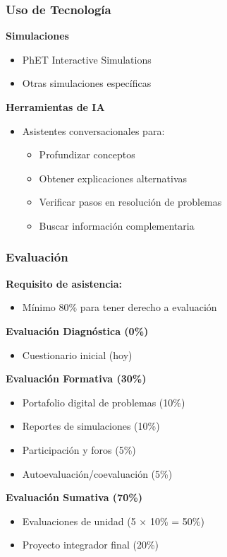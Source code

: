 \documentclass{beamer}
\begin{document}
\begin{frame}
    \frametitle{Uso de Tecnología}
    
    \textbf{Simulaciones}
    \begin{itemize}
        \item PhET Interactive Simulations
        \item Otras simulaciones específicas
    \end{itemize}
    \vspace{0.3cm}
    
    \textbf{Herramientas de IA}
    \begin{itemize}
        \item Asistentes conversacionales para:
        \begin{itemize}
            \item Profundizar conceptos
            \item Obtener explicaciones alternativas
            \item Verificar pasos en resolución de problemas
            \item Buscar información complementaria
        \end{itemize}
    \end{itemize}
\end{frame}

\begin{frame}
    \frametitle{Evaluación}
    
    \textbf{Requisito de asistencia:}
    \begin{itemize}
        \item Mínimo 80\% para tener derecho a evaluación
    \end{itemize}
    \vspace{0.2cm}
    
    \textbf{Evaluación Diagnóstica (0\%)}
    \begin{itemize}
        \item Cuestionario inicial (hoy)
    \end{itemize}
    \vspace{0.2cm}
    
    \textbf{Evaluación Formativa (30\%)}
    \begin{itemize}
        \item Portafolio digital de problemas (10\%)
        \item Reportes de simulaciones (10\%)
        \item Participación y foros (5\%)
        \item Autoevaluación/coevaluación (5\%)
    \end{itemize}
    \vspace{0.2cm}
    
    \textbf{Evaluación Sumativa (70\%)}
    \begin{itemize}
        \item Evaluaciones de unidad (5 × 10\% = 50\%)
        \item Proyecto integrador final (20\%)
    \end{itemize}
\end{frame}
\end{document}
